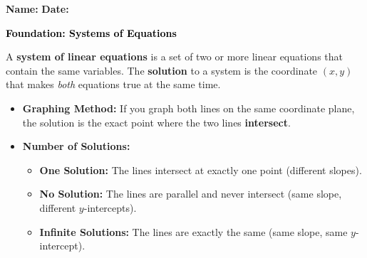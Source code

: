 \documentclass[12pt, letterpaper, fleqn]{article}
\begin{document}
\textbf{Name:} \underline{\hspace{5cm}}
\hfill
\textbf{Date:} \underline{\hspace{3cm}}\\

\begin{tcolorbox}[colback=customteal!20]
    \large\textcolor{black}{\textbf{Foundation: Systems of Equations}}
\end{tcolorbox}

\vspace{3mm}

\noindent
A \textbf{system of linear equations} is a set of two or more linear equations that contain the same variables. The \textbf{solution} to a system is the coordinate $(x, y)$ that makes \textit{both} equations true at the same time.

\begin{itemize}
    \item \textbf{Graphing Method:} If you graph both lines on the same coordinate plane, the solution is the exact point where the two lines \textbf{intersect}.
    \item \textbf{Number of Solutions:} 
    \begin{itemize}
        \item \textbf{One Solution:} The lines intersect at exactly one point (different slopes).
        \item \textbf{No Solution:} The lines are parallel and never intersect (same slope, different $y$-intercepts).
        \item \textbf{Infinite Solutions:} The lines are exactly the same (same slope, same $y$-intercept).
    \end{itemize}
\end{itemize}

\vspace{4mm}
\end{document}
